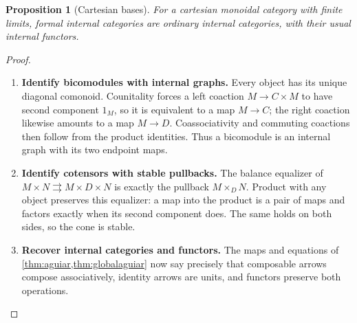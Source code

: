 \documentclass[11pt,reqno]{amsart}
\theoremstyle{plain}
\newtheorem{proposition}[theorem]{Proposition}
\theoremstyle{definition}
\theoremstyle{remark}
\numberwithin{equation}{section}
\begin{document}
\begin{proposition}[Cartesian bases]
For a cartesian monoidal category with finite limits, formal internal
categories are ordinary internal categories, with their usual internal
functors.
\end{proposition}
\begin{proof}\leavevmode
\begin{enumerate}
\item \textbf{Identify bicomodules with internal graphs.} Every object has its unique diagonal comonoid. Counitality forces a
left coaction $M\to C\times M$ to have second component $1_M$,
so it is equivalent to a map $M\to C$; the right coaction likewise
amounts to a map $M\to D$. Coassociativity and commuting coactions
then follow from the product identities. Thus a bicomodule is an
internal graph with its two endpoint maps.

\item \textbf{Identify cotensors with stable pullbacks.} The balance equalizer of
$M\times N\rightrightarrows M\times D\times N$ is exactly
the pullback $M\times_D N$. Product with any object preserves
this equalizer: a map into the product is a pair of maps and factors
exactly when its second component does. The same holds on both
sides, so the cone is stable.

\item \textbf{Recover internal categories and functors.} The maps and equations of
\cref{thm:aguiar,thm:globalaguiar} now say precisely that composable
arrows compose associatively, identity arrows are units, and functors
preserve both operations.\qedhere
\end{enumerate}
\end{proof}
\end{document}
